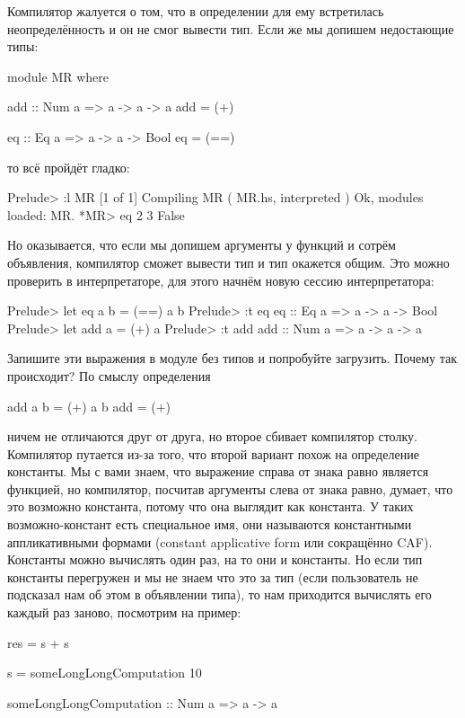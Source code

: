 Компилятор жалуется о том, что в определении для 
ему встретилась неопределённость и он не смог вывести тип. 
Если же мы допишем недостающие типы:

\begin{code}
module MR where

add :: Num a => a -> a -> a
add = (+)

eq :: Eq a => a -> a -> Bool
eq  = (==)
\end{code}

то всё пройдёт гладко:

\begin{code}
Prelude> :l MR
[1 of 1] Compiling MR               ( MR.hs, interpreted )
Ok, modules loaded: MR.
*MR> eq 2 3
False
\end{code}

Но оказывается, что если мы допишем аргументы у функций
и сотрём объявления, компилятор сможет вывести тип и
тип окажется общим. Это можно проверить в интерпретаторе,
для этого начнём новую сессию интерпретатора:

\begin{code}
Prelude> let eq a b = (==) a b 
Prelude> :t eq
eq :: Eq a => a -> a -> Bool
Prelude> let add a = (+) a
Prelude> :t add
add :: Num a => a -> a -> a
\end{code}

Запишите эти выражения в модуле без типов и попробуйте
загрузить. Почему так происходит? По смыслу определения

\begin{code}
add a b = (+) a b
add     = (+)
\end{code}

\noindent ничем не отличаются друг от друга, но второе
сбивает компилятор столку. Компилятор путается из-за
того, что второй вариант похож на определение константы.
Мы с вами знаем, что выражение справа от знака равно является
функцией, но компилятор, посчитав аргументы слева от знака
равно, думает, что это возможно константа, потому что она
выглядит как константа. У таких возможно-констант
есть специальное имя, они называются константными аппликативными
формами (constant applicative form или сокращённо CAF). 
Константы можно вычислять один раз, на то они и константы. 
Но если тип константы перегружен и мы не знаем что 
это за тип (если пользователь не подсказал нам об этом в 
объявлении типа), то нам приходится вычислять его 
каждый раз заново, посмотрим на пример:

\begin{code}
res = s + s

s = someLongLongComputation 10

someLongLongComputation :: Num a => a -> a
\end{code}

